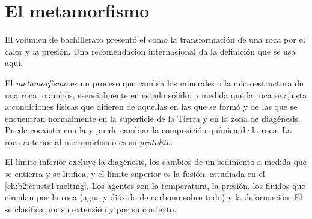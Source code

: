 \section{El metamorfismo}\label{sec:b2:metamorphic-facies:metamorphism}

El volumen de bachillerato presentó el  como la transformación de una roca por el calor y
la presión. Una recomendación internacional da la definición que se usa aquí.

\begin{definition}\label{def:b2:metamorphic-facies:metamorphism}
El \emph{metamorfismo} es un proceso que cambia los minerales o la
microestructura de una roca, o ambos, esencialmente en estado sólido, a medida que la roca se ajusta
a condiciones físicas que difieren de aquellas en las que se formó y de las que
se encuentran normalmente en la superficie de la Tierra y en la zona de diagénesis. Puede coexistir con
la  y puede cambiar la composición química de la roca. La roca anterior al
metamorfismo es su \emph{protolito}.
\end{definition}

El límite inferior excluye la diagénesis, los cambios de un sedimento a medida que se entierra y
se litifica, y el límite superior es la fusión, estudiada en el \cref{ch:b2:crustal-melting}. Los
agentes son la temperatura, la presión, los fluidos que circulan por la roca (agua y
dióxido de carbono sobre todo) y la deformación. El  se clasifica por su extensión y
por su contexto.

